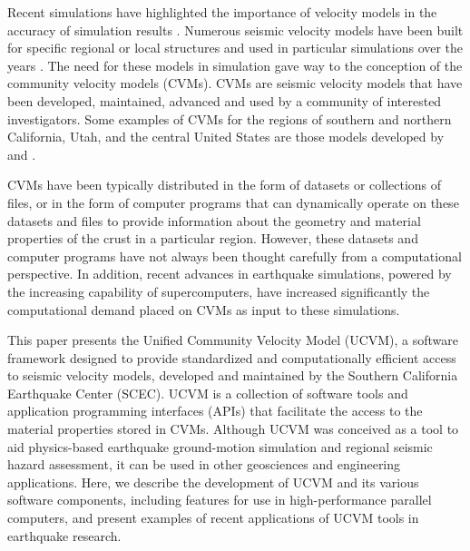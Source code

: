 Recent simulations have highlighted the importance of velocity models in the accuracy of simulation results \citep[e.g.,][]{Taborda_2014_BSSA}. Numerous seismic velocity models have been built for specific regional or local structures and used in particular simulations over the years \citep[e.g.,][]{Frankel_1992_BSSA, Brocher_2008_BSSA, Graves_2008_BSSA}. The need for these models in simulation gave way to the conception of the community velocity models (CVMs). CVMs are seismic velocity models that have been developed, maintained, advanced and used by a community of interested investigators. Some examples of CVMs for the regions of southern and northern California, Utah, and the central United States are those models developed by \citet{Kohler_2003_BSSA, Brocher_2006_Proc, Magistrale_2006_Tech} and \citet{RamirezGuzman_2012_BSSA}. 

CVMs have been typically distributed in the form of datasets or collections of files, or in the form of computer programs that can dynamically operate on these datasets and files to provide information about the geometry and material properties of the crust in a particular region. However, these datasets and computer programs have not always been thought carefully from a computational perspective. In addition, recent advances in earthquake simulations, powered by the increasing capability of supercomputers, have increased significantly the computational demand placed on CVMs as input to these simulations. 

This paper presents the Unified Community Velocity Model (UCVM), a software framework designed to provide standardized and computationally efficient access to seismic velocity models, developed and maintained by the Southern California Earthquake Center (SCEC). UCVM is a collection of software tools and application programming interfaces (APIs) that facilitate the access to the material properties stored in CVMs. Although UCVM was conceived as a tool to aid physics-based earthquake ground-motion simulation and regional seismic hazard assessment, it can be used in other geosciences and engineering applications. Here, we describe the development of UCVM and its various software components, including features for use in high-performance parallel computers, and present examples of recent applications of UCVM tools in earthquake research.



